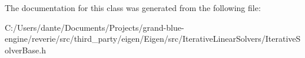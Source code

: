 The documentation for this class was generated from the following file\+:\begin{DoxyCompactItemize}
\item 
C\+:/\+Users/dante/\+Documents/\+Projects/grand-\/blue-\/engine/reverie/src/third\+\_\+party/eigen/\+Eigen/src/\+Iterative\+Linear\+Solvers/Iterative\+Solver\+Base.\+h\end{DoxyCompactItemize}
